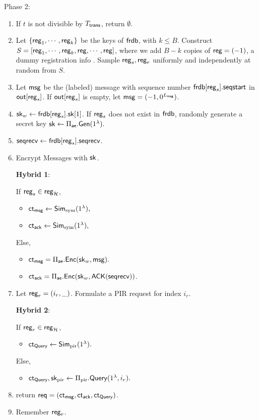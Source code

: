 Phase 2:
\begin{enumerate}
    \item If $t$ is not divisible by $T_{\mathsf{trans}}$, return $\emptyset$.
    \item Let $\{\mathsf{reg}_1, \cdots, \mathsf{reg}_k\}$ be the keys of $\mathsf{frdb}$, with $k\leq B$. Construct $S = [\mathsf{reg}_1,\cdots, \mathsf{reg}_k, \mathsf{reg}, \cdots, \mathsf{reg}]$, where we add $B - k$ copies of $\mathsf{reg} = (-1)$, a dummy registration info . Sample $\mathsf{reg}_s, \mathsf{reg}_r$ uniformly and independently at random from $S$. 
    \item Let $\mathsf{msg}$ be the (labeled) message with sequence number $\mathsf{frdb}[\mathsf{reg}_s].\mathsf{seqstart}$ in $\mathsf{out}[\mathsf{reg}_s]$. If $\mathsf{out}[\mathsf{reg}_s]$ is empty, let $\mathsf{msg} = (-1, 0^{L_{\mathsf{msg}}})$.
    \item ${\mathsf{sk}}_w \leftarrow \mathsf{frdb}[\mathsf{reg}_s].{\mathsf{sk}}[1]$. If $\mathsf{reg}_s$ does not exist in $\mathsf{frdb}$, randomly generate a secret key ${\mathsf{sk}} \leftarrow \Pi_{\mathsf{ae}}.\mathsf{Gen}(1^{\lambda}).$
    \item $\mathsf{seqrecv} \leftarrow \mathsf{frdb}[\mathsf{reg}_s].\mathsf{seqrecv}$.
    \item Encrypt Messages with ${\mathsf{sk}}$.

    \begin{siderule}
        { 
        \textbf{Hybrid 1}:
        
        If $\mathsf{reg}_s \in \mathsf{reg}_{\mathcal{H}}$, 
        \begin{itemize}
            \item $\mathsf{ct}_{\mathsf{msg}} \leftarrow \mathsf{Sim}_{\text{sym}}(1^{\lambda}),$
            \item $\mathsf{ct}_{\mathsf{ack}} \leftarrow \mathsf{Sim}_{\text{sym}}(1^{\lambda}),$
        \end{itemize}
        Else, 
        }
    \end{siderule}
    
    
    \begin{itemize}
        \item $\mathsf{ct}_{\mathsf{msg}} = \Pi_{\mathsf{ae}}.\mathsf{Enc}({\mathsf{sk}}_w, \mathsf{msg}).$
        \item $\mathsf{ct}_{\mathsf{ack}} = \Pi_{\mathsf{ae}}.\mathsf{Enc}({\mathsf{sk}}_w, \mathsf{ACK}(\mathsf{seqrecv}))$.
    \end{itemize}
    \item Let $\mathsf{reg}_r = (i_r, \_)$. Formulate a PIR request for index $i_r$. 

     \begin{siderule}
     {
     
          
     \textbf{Hybrid 2}:
         
     If $\mathsf{reg}_r \in \mathsf{reg}_{\mathcal{H}}$, 
    \begin{itemize}
        \item $\mathsf{ct}_{\mathsf{Query}} \leftarrow \mathsf{Sim}_{\text{pir}}(1^{\lambda}).$
    \end{itemize}
    Else, 
    }
    \end{siderule}
    \begin{itemize}
        \item $\mathsf{ct}_{\mathsf{Query}}, {\mathsf{sk}}_{\text{pir}} \leftarrow \Pi_{\text{pir}}.\mathsf{Query}(1^{\lambda}, i_r).$
    \end{itemize}
    \item return $\mathsf{req} = (\mathsf{ct}_{\mathsf{msg}}, \mathsf{ct}_{\mathsf{ack}}, \mathsf{ct}_{\mathsf{Query}})$.
    \item Remember $\mathsf{reg}_r$.
\end{enumerate}
